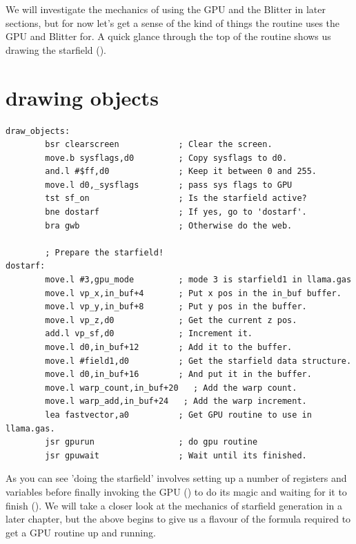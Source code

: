 We will investigate the mechanics of using the GPU and the Blitter in later sections, but for now let's get a
sense of the kind of things the  routine uses the GPU and Blitter for.
A quick glance through the top of the routine shows us drawing the starfield ().

\section*{drawing objects}
\begin{lstlisting}[escapechar=\%]
draw_objects:
        bsr clearscreen            ; Clear the screen.
        move.b sysflags,d0         ; Copy sysflags to d0.
        and.l #$ff,d0              ; Keep it between 0 and 255.
        move.l d0,_sysflags        ; pass sys flags to GPU
        tst sf_on                  ; Is the starfield active?
        bne dostarf                ; If yes, go to 'dostarf'.
        bra gwb                    ; Otherwise do the web.
    
        ; Prepare the starfield!
dostarf:
        move.l #3,gpu_mode         ; mode 3 is starfield1 in llama.gas
        move.l vp_x,in_buf+4       ; Put x pos in the in_buf buffer.
        move.l vp_y,in_buf+8       ; Put y pos in the buffer.
        move.l vp_z,d0             ; Get the current z pos.
        add.l vp_sf,d0             ; Increment it.
        move.l d0,in_buf+12        ; Add it to the buffer.
        move.l #field1,d0          ; Get the starfield data structure.
        move.l d0,in_buf+16        ; And put it in the buffer.
        move.l warp_count,in_buf+20   ; Add the warp count.
        move.l warp_add,in_buf+24   ; Add the warp increment.
        lea fastvector,a0          ; Get GPU routine to use in llama.gas.
        jsr gpurun                 ; do gpu routine
        jsr gpuwait                ; Wait until its finished.
\end{lstlisting}

As you can see 'doing the starfield' involves setting up a number of registers and variables
before finally invoking the GPU () to do its magic and waiting for it to finish
(). We will take a closer look at the mechanics of starfield generation in a later
chapter, but the above begins to give us a flavour of the formula required to get a GPU routine up 
and running.

